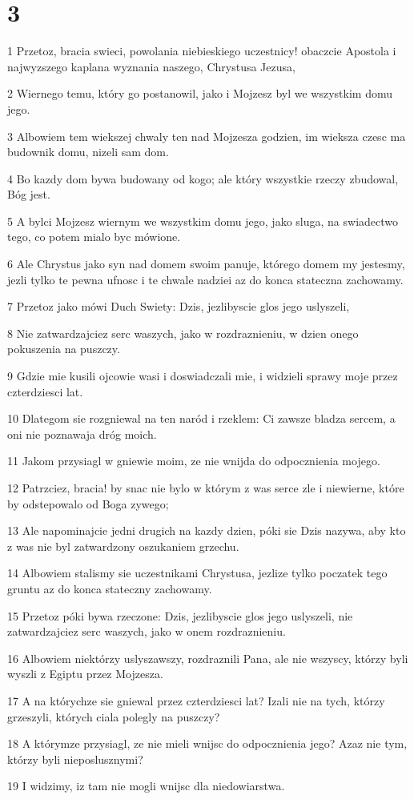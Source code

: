 \chapter{3}

\par 1 Przetoz, bracia swieci, powolania niebieskiego uczestnicy! obaczcie Apostola i najwyzszego kaplana wyznania naszego, Chrystusa Jezusa,
\par 2 Wiernego temu, który go postanowil, jako i Mojzesz byl we wszystkim domu jego.
\par 3 Albowiem tem wiekszej chwaly ten nad Mojzesza godzien, im wieksza czesc ma budownik domu, nizeli sam dom.
\par 4 Bo kazdy dom bywa budowany od kogo; ale który wszystkie rzeczy zbudowal, Bóg jest.
\par 5 A bylci Mojzesz wiernym we wszystkim domu jego, jako sluga, na swiadectwo tego, co potem mialo byc mówione.
\par 6 Ale Chrystus jako syn nad domem swoim panuje, którego domem my jestesmy, jezli tylko te pewna ufnosc i te chwale nadziei az do konca stateczna zachowamy.
\par 7 Przetoz jako mówi Duch Swiety: Dzis, jezlibyscie glos jego uslyszeli,
\par 8 Nie zatwardzajciez serc waszych, jako w rozdraznieniu, w dzien onego pokuszenia na puszczy.
\par 9 Gdzie mie kusili ojcowie wasi i doswiadczali mie, i widzieli sprawy moje przez czterdziesci lat.
\par 10 Dlategom sie rozgniewal na ten naród i rzeklem: Ci zawsze bladza sercem, a oni nie poznawaja dróg moich.
\par 11 Jakom przysiagl w gniewie moim, ze nie wnijda do odpocznienia mojego.
\par 12 Patrzciez, bracia! by snac nie bylo w którym z was serce zle i niewierne, które by odstepowalo od Boga zywego;
\par 13 Ale napominajcie jedni drugich na kazdy dzien, póki sie Dzis nazywa, aby kto z was nie byl zatwardzony oszukaniem grzechu.
\par 14 Albowiem stalismy sie uczestnikami Chrystusa, jezlize tylko poczatek tego gruntu az do konca stateczny zachowamy.
\par 15 Przetoz póki bywa rzeczone: Dzis, jezlibyscie glos jego uslyszeli, nie zatwardzajciez serc waszych, jako w onem rozdraznieniu.
\par 16 Albowiem niektórzy uslyszawszy, rozdraznili Pana, ale nie wszyscy, którzy byli wyszli z Egiptu przez Mojzesza.
\par 17 A na którychze sie gniewal przez czterdziesci lat? Izali nie na tych, którzy grzeszyli, których ciala polegly na puszczy?
\par 18 A którymze przysiagl, ze nie mieli wnijsc do odpocznienia jego? Azaz nie tym, którzy byli nieposlusznymi?
\par 19 I widzimy, iz tam nie mogli wnijsc dla niedowiarstwa.

